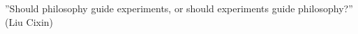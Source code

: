 


\vspace*{10cm}
\begin{citacao}
\end{citacao}

    \vspace*{5cm}
	
		''Should philosophy guide experiments, or should experiments guide philosophy?'' (Liu Cixin) 
	
\newpage